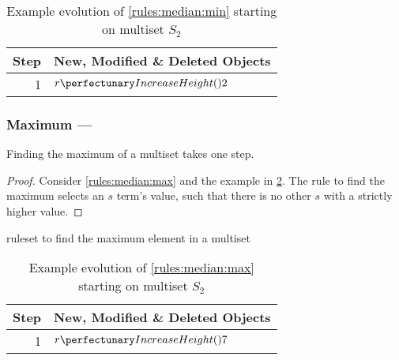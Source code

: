 \begin{table}[htbp]
\centering
\begin{tabular}{|r|l|}
    \hline
    \textbf{Step} & \textbf{New, Modified \& Deleted Objects} \\ \hline
    1 & \(\cpfunc{r}{2}\) \\ \hline
\end{tabular}
\caption[Example evolution of \cref{rules:median:min}]{\label{tab:median:min}Example evolution of \cref{rules:median:min} starting on multiset \(S_2\)}
\end{table}

\subsubsection{\label{sec:median:max}Maximum --- }

\begin{proposition}\label{prop:median:max}
Finding the maximum of a multiset takes one step.
\end{proposition}

\begin{proof}
Consider \cref{rules:median:max} and the example in \cref{tab:median:max}.  The rule to find the maximum selects an \(s\) term's value, such that there is no other \(s\) with a strictly higher value.
\end{proof}

\begin{cprulesetfloat}
\begin{cpruleset}


\end{cpruleset}
\caption{\label{rules:median:max}\Gls{ruleset} to find the maximum element in a multiset}
\end{cprulesetfloat}

\begin{table}[htbp]
\centering
\begin{tabular}{|r|l|}
    \hline
    \textbf{Step} & \textbf{New, Modified \& Deleted Objects} \\ \hline
    1 & \(\cpfunc{r}{7}\)\\ \hline
\end{tabular} 
\caption[Example evolution of \cref{rules:median:max}]{\label{tab:median:max}Example evolution of \cref{rules:median:max} starting on multiset \(S_2\)}
\end{table}

